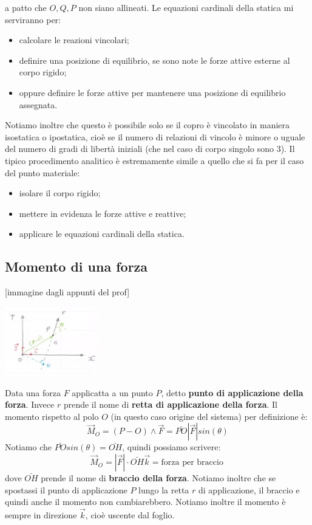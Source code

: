 a patto che $O,Q,P$ non siano allineati.\newline
\newline
Le equazioni cardinali della statica mi serviranno per:
\begin{itemize}
    \item calcolare le reazioni vincolari;
    \item definire una posizione di equilibrio, se sono note le forze attive esterne al corpo rigido;
    \item oppure definire le forze attive per mantenere una posizione di equilibrio assegnata. 
\end{itemize}
Notiamo inoltre che questo è possibile solo se il copro è vincolato in maniera isostatica o ipostatica, cioè se il numero di relazioni di vincolo è minore o uguale del numero di gradi di libertà iniziali (che nel caso di corpo singolo sono $3$).
\newline
\newline
Il tipico procedimento analitico è estremamente simile a quello che si fa per il caso del punto materiale:
\begin{itemize}
    \item isolare il corpo rigido;
    \item mettere in evidenza le forze attive e reattive;
    \item applicare le equazioni cardinali della statica.
\end{itemize}
\subsection{Momento di una forza}
[immagine dagli appunti del prof]
\begin{center}
    \includegraphics[height=3cm]{../lezione6/img10.JPG}
\end{center}
Data una forza $F$ applicatta a un punto $P$, detto \textbf{punto di applicazione della forza}. Invece $r$ prende il nome di \textbf{retta di applicazione della forza}.\newline
\newline
Il momento rispetto al polo $O$ (in questo caso origine del sistema) per definizione è:
\[
    \vec{M}_O = (P-O) \land \vec{F} = \bar{PO} |\vec{F}| sin(\theta)
\]
Notiamo che $\bar{PO} sin(\theta) = \bar{OH}$, quindi possiamo scrivere:
\[
    \vec{M}_O = |\vec{F}| \cdot  \bar{OH} \vec{k} = \text{forza per braccio}\; 
\]
dove $\bar{OH}$ prende il nome di \textbf{braccio della forza}.\newline
\newline
Notiamo inoltre che se spostassi il punto di applicazione $P$ lungo la retta $r$ di applicazione, il braccio e quindi anche il momento non cambiarebbero.\newline
\newline
Notiamo inoltre il momento è sempre in direzione $\vec{k}$, cioè uscente dal foglio.
